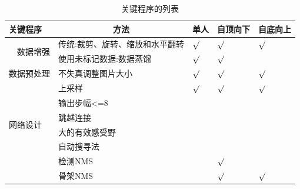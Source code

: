 \documentclass[hyperref]{ctexart}
\begin{document}
\begin{table}[H]
	\centering
	\caption{关键程序的列表}
	\begin{tabular}{lllll}
		\hline
		关键程序                                      & \multicolumn{1}{c}{方法} & 单人      & 自顶向下    & 自底向上    \\ \hline
		\multicolumn{1}{r}{\multirow{2}{*}{数据增强}} & 传统:裁剪、旋转、缩放和水平翻转       & $\surd$ & $\surd$ & $\surd$ \\ \cline{2-5} 
		\multicolumn{1}{r}{}                      & 使用未标记数据:数据蒸馏           & $\surd$ & $\surd$ &         \\ \hline
		数据预处理                                     & 不失真调整图片大小              & $\surd$ & $\surd$ & $\surd$ \\ \hline
		\multirow{6}{*}{网络设计}                     & 上采样                  & $\surd$ & $\surd$ & $\surd$ \\
		& 输出步幅\textless{}=8      &         &         &         \\
		& 跳越连接                   &         &         &         \\
		& 大的有效感受野                &         &         &         \\
		& 自动搜寻法                  &         &         &         \\ \hline
		\multirow{2}{*}{后处理}                      & 检测NMS                  &         & $\surd$ &         \\ \cline{2-5} 
		& 骨架NMS                  &         & $\surd$ & $\surd$ \\ \hline
	\end{tabular}
	\label{table1}
\end{table}
\end{document}
